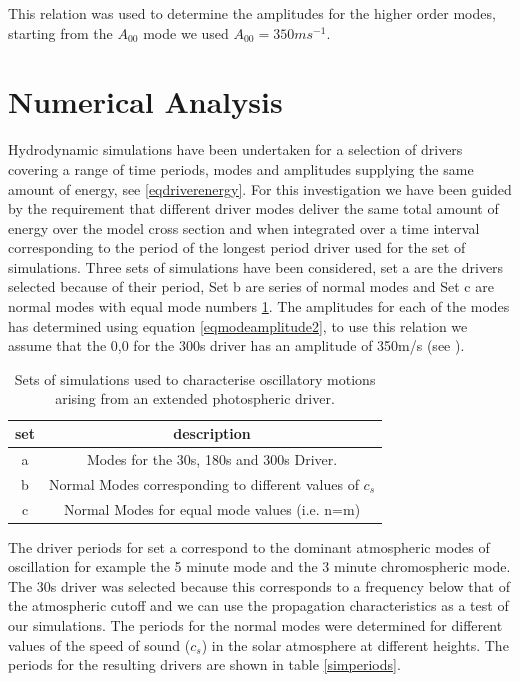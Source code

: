 \documentclass[authoryear,final,1p]{elsarticle}
\begin{document}
This relation was used to determine the amplitudes for the higher order modes, starting from the $A_{00}$ mode we used  $A_{00}=350ms^{-1}$.



\section{Numerical Analysis}
Hydrodynamic simulations have been undertaken for a selection of drivers covering a range of time periods, modes and amplitudes supplying the same amount of energy, see \eqref{eqdriverenergy}. For this investigation we have been guided by the requirement that  different driver modes deliver the same total amount of energy over the model cross section and when integrated over a time interval corresponding to the period of the longest period driver used for the set of simulations. Three sets of simulations have been considered, set a are the drivers selected because of their period, Set b are series of normal modes and Set c  are normal modes with equal mode numbers \ref{simsetstab}. The amplitudes for each of the modes has determined using  equation \eqref{eqmodeamplitude2}, to use this relation we assume that the 0,0 for the 300s driver has an amplitude of 350m/s (see \citet{Leighton1960}).

\begin{table}\label{simsetstab}
\centering
\begin{tabular}{c c }
\hline
set   &  description\\
\hline
a &  Modes for the 30s, 180s and 300s Driver. \\
\hline
b &  Normal Modes corresponding to different values of $c_s$ \\
\hline
c & Normal Modes for equal mode values (i.e. n=m)  \\
\hline
\end{tabular} 
\caption{Sets of simulations used to characterise oscillatory motions arising from an extended photospheric driver.}
\end{table}

The driver periods for set a correspond to the dominant atmospheric modes of oscillation for example the 5 minute mode and the 3 minute chromospheric mode. The 30s driver was selected because this corresponds to a frequency below that of the atmospheric cutoff and we can use the propagation characteristics as a test of our simulations. The periods for the normal modes were determined for different values of the speed of sound ($c_s$) in the solar atmosphere at different heights. The periods for the resulting drivers are shown in table \ref{simperiods}.
\end{document}
